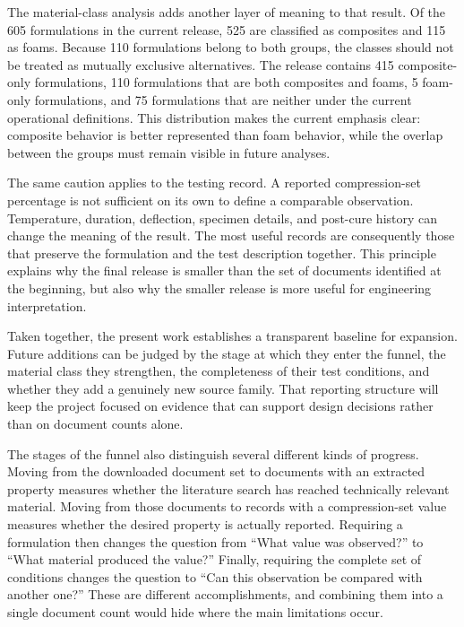 \documentclass[10pt]{article}
\begin{document}
The material-class analysis adds another layer of meaning to that result. Of
the 605 formulations in the current release, 525 are classified as composites
and 115 as foams. Because 110 formulations belong to both groups, the classes
should not be treated as mutually exclusive alternatives. The release contains
415 composite-only formulations, 110 formulations that are both composites and
foams, 5 foam-only formulations, and 75 formulations that are neither under the
current operational definitions. This distribution makes the current emphasis
clear: composite behavior is better represented than foam behavior, while the
overlap between the groups must remain visible in future analyses.

The same caution applies to the testing record. A reported compression-set
percentage is not sufficient on its own to define a comparable observation.
Temperature, duration, deflection, specimen details, and post-cure history can
change the meaning of the result. The most useful records are consequently
those that preserve the formulation and the test description together. This
principle explains why the final release is smaller than the set of documents
identified at the beginning, but also why the smaller release is more useful for
engineering interpretation.

Taken together, the present work establishes a transparent baseline for
expansion. Future additions can be judged by the stage at which they enter the
funnel, the material class they strengthen, the completeness of their test
conditions, and whether they add a genuinely new source family. That reporting
structure will keep the project focused on evidence that can support design
decisions rather than on document counts alone.

The stages of the funnel also distinguish several different kinds of progress.
Moving from the downloaded document set to documents with an extracted property
measures whether the literature search has reached technically relevant
material. Moving from those documents to records with a compression-set value
measures whether the desired property is actually reported. Requiring a
formulation then changes the question from “What value was observed?” to “What
material produced the value?” Finally, requiring the complete set of conditions
changes the question to “Can this observation be compared with another one?”
These are different accomplishments, and combining them into a single document
count would hide where the main limitations occur.
\end{document}
